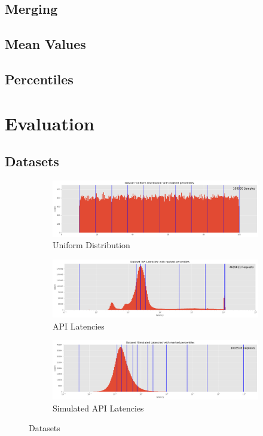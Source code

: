 \documentclass{article}
\theoremstyle{plain}
\theoremstyle{remark}
\begin{document}
\subsection{Merging}

\subsection{Mean Values}

\subsection{Percentiles}

\section{Evaluation}

\subsection{Datasets}

\begin{figure}
    \begin{subfigure}[b]{0.9\textwidth}
        \includegraphics[width=\textwidth]{evaluation/images/Uniform_Distribution_distribution_percentiles.png}
        \caption{Uniform Distribution}
    \end{subfigure}
    \begin{subfigure}[b]{0.9\textwidth}
        \includegraphics[width=\textwidth]{evaluation/images/API_Latencies_distribution_percentiles.png}
        \caption{API Latencies}
    \end{subfigure}
    \begin{subfigure}[b]{0.9\textwidth}
        \includegraphics[width=\textwidth]{evaluation/images/Simulated_Latencies_distribution_percentiles.png}
        \caption{Simulated API Latencies}
    \end{subfigure}
    \caption{Datasets}
\end{figure}
\end{document}
